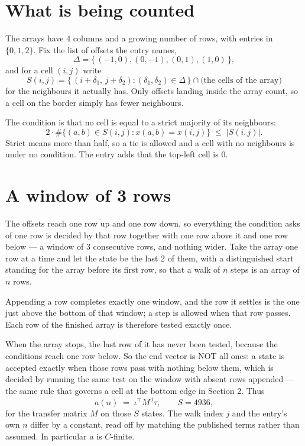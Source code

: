 \documentclass[11pt,a4paper]{article}
\theoremstyle{plain}
\theoremstyle{definition}
\begin{document}
\section{What is being counted}

The arrays have $4$ columns and a growing number of rows, with entries in $\{0,1,2\}$. Fix the
list of offsets the entry names,
\[
\Delta=\{\,(-1,0), (0,-1), (0,1), (1,0)\,\},
\]
and for a cell $(i,j)$ write
\[
S(i,j)=\{\,(i+\delta_1,\,j+\delta_2) : (\delta_1,\delta_2)\in\Delta\,\}\cap
\text{(the cells of the array)}
\]
for the neighbours it actually has. Only offsets landing inside the array count, so a cell on
the border simply has fewer neighbours.

The condition is that no cell is equal to a strict majority of its neighbours:
\[
2\cdot\#\{(a,b)\in S(i,j) : x(a,b)=x(i,j)\}\;\le\;|S(i,j)| .
\]
Strict means more than half, so a tie is allowed and a cell with no neighbours is under no condition. The entry adds that the top-left cell is $0$.

\section{A window of 3 rows}

The offsets reach one row up and one row down, so everything the condition asks of one row is
decided by that row together with one row above it and one row below --- a window of
$3$ consecutive rows, and nothing wider. Take the array one row at a time
and let the state be the last 2 of them, with a distinguished start standing for the
array before its first row, so that a walk of $n$ steps is an array of $n$ rows.

Appending a row completes exactly one window, and the row it settles is the one just above the bottom of that window; a step is
allowed when that row passes. Each row of the finished
array is therefore tested exactly once.

When the array stops, the last row of it has never been tested, because the
conditions reach one row below. So the end vector is NOT all ones: a state is accepted exactly when
those rows pass with nothing below them, which is decided by running the same test on the window
with absent rows appended --- the same rule that governs a cell at the bottom edge in
Section 2.
Thus
\[
a(n)\;=\;\iota^{\!\top}M^{\,j}\tau ,\qquad S=4936,
\]
for the transfer matrix $M$ on those $S$ states. The walk index $j$ and the entry's own $n$
differ by a constant, read off by matching the published terms rather than assumed. In
particular $a$ is $C$-finite.
\end{document}
